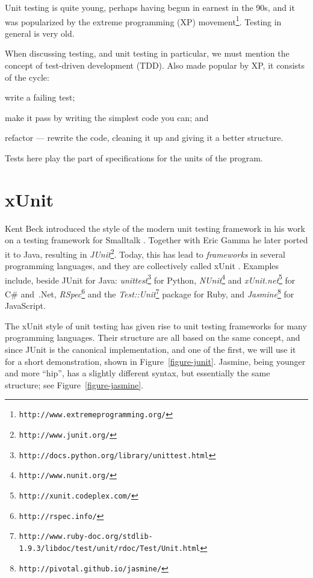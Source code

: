 Unit testing is quite young, perhaps having begun in earnest in the 90s, and it
was popularized by the extreme programming (XP)
movement\footnote{\texttt{http://www.extremeprogramming.org/}}. Testing in
general is very old.

When discussing testing, and unit testing in particular, we must mention the
concept of test-driven development (TDD). Also made popular by XP, it consists
of the cycle:
\begin{inparaenum}[1\upshape)]
  \item write a failing test;
  \item make it pass by writing the simplest code you can; and
  \item refactor --- rewrite the code, cleaning it up and giving it a better
    structure.
\end{inparaenum}
Tests here play the part of specifications for the units of the program.


\section{xUnit} \label{section-xunit}

Kent Beck introduced the style of the modern unit testing framework in his work
on a testing framework for Smalltalk \cite{becksmalltalktesting}. Together
with Eric Gamma he later ported it to Java, resulting in
\textit{JUnit}\footnote{\texttt{http://www.junit.org/}}.
Today, this has lead to \textit{frameworks} in several programming languages,
and they are collectively called xUnit \cite{fowlerxunit}. Examples include,
beside JUnit for Java:
\textit{unittest}\footnote{\texttt{http://docs.python.org/library/unittest.html}}
for Python,
\textit{NUnit}\footnote{\texttt{http://www.nunit.org/}} and
\textit{xUnit.net}\footnote{\texttt{http://xunit.codeplex.com/}} for C\#
and~.Net,
\textit{RSpec}\footnote{\texttt{http://rspec.info/}} and the
\textit{Test::Unit}\footnote{\texttt{http://www.ruby-doc.org/stdlib-1.9.3/libdoc/test/unit/rdoc/Test/Unit.html}}
package for Ruby,
and \textit{Jasmine}\footnote{\texttt{http://pivotal.github.io/jasmine/}} for
JavaScript.

The xUnit style of unit testing \cite{fowlerxunit} has given rise to unit
testing frameworks for many programming languages. Their structure are all
based on the same concept, and since JUnit is the canonical implementation, and
one of the first, we will use it for a short demonstration,
shown in Figure~\ref{figure-junit}. Jasmine, being younger and more ``hip'',
has a slightly different syntax, but essentially the same structure; see
Figure~\ref{figure-jasmine}.

